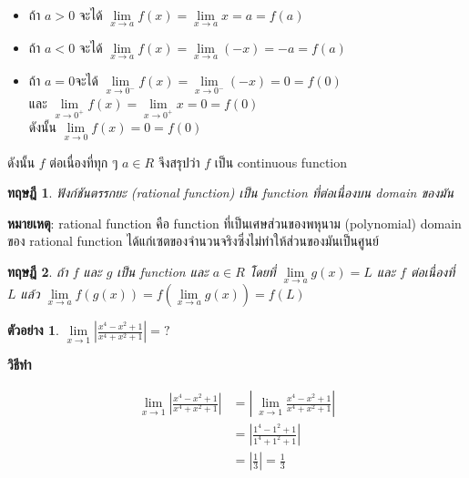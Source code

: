 \documentclass[
]{book}
\newtheorem{theorem}{ทฤษฎี}[chapter]
\theoremstyle{definition}
\theoremstyle{definition}
\newtheorem{example}{ตัวอย่าง}[chapter]
\theoremstyle{definition}
\theoremstyle{definition}
\theoremstyle{remark}
\begin{document}
\begin{itemize}
\item
  ถ้า \(a>0\) จะได้
  \(\underset{x\rightarrow a}{\lim}f(x)=\underset{x\rightarrow a}{\lim}x=a=f(a)\)
\item
  ถ้า \(a<0\) จะได้
  \(\underset{x\rightarrow a}{\lim}f(x)=\underset{x\rightarrow a}{\lim}(-x)=-a=f(a)\)
\item
  ถ้า \(a=0\)จะได้
  \(\underset{x\rightarrow 0^{-}}{\lim}f(x)=\underset{x\rightarrow 0^{-}}{\lim}(-x)=0=f(0)\)\\
  และ
  \(\underset{x\rightarrow 0^{+}}{\lim}f(x)=\underset{x\rightarrow 0^{+}}{\lim}x=0=f(0)\)\\
  ดังนั้น \(\underset{x\rightarrow 0}{\lim}f(x)=0=f(0)\)
\end{itemize}

ดังนั้น \(f\) ต่อเนื่องที่ทุก ๆ \(a\in R\) จึงสรุปว่า \(f\) เป็น continuous function

\begin{theorem}
\protect\hypertarget{thm:thm-cont-2}{}\label{thm:thm-cont-2}ฟังก์ชันตรรกยะ (rational function) เป็น function ที่ต่อเนื่องบน domain ของมัน
\end{theorem}

\textbf{หมายเหตุ}: rational function คือ function ที่เป็นเศษส่วนของพหุนาม
(polynomial) domain ของ rational function
ได้แก่เซตของจำนวนจริงซึ่งไม่ทำให้ส่วนของมันเป็นศูนย์

\begin{theorem}
\protect\hypertarget{thm:thm-cont-3}{}\label{thm:thm-cont-3}ถ้า \(f\) และ \(g\) เป็น function และ \(a\in R\) โดยที่
\(\underset{x\rightarrow a}{\lim}g(x)=L\) และ \(f\) ต่อเนื่องที่ \(L\) แล้ว
\(\underset{x\rightarrow a}{\lim}f(g(x))=f(\underset{x\rightarrow a}{\lim}g(x))=f(L)\)
\end{theorem}

\begin{example}
\protect\hypertarget{exm:ex-cont-2}{}\label{exm:ex-cont-2}\(\underset{x\rightarrow 1}{\lim}\left| \frac{x^{4}-x^{2}+1}{x^{4}+x^{2}+1}\right| =?\)
\end{example}

\textbf{วิธีทำ}

\begin{equation}
  \begin{aligned}
    \underset{x\rightarrow 1}{\lim}\left| \frac{x^{4}-x^{2}+1}{x^{4}+x^{2}+1}\right|
    &=\left| \ \underset{x\rightarrow 1}{\lim}\frac{x^{4}-x^{2}+1}{x^{4}+x^{2}+1}\right| \\
    &=\left| \frac{1^{4}-1^{2}+1}{1^{4}+1^{2}+1}\right| \\
    &=\left| \frac{1}{3}\right| =\frac{1}{3}
  \end{aligned}
\end{equation}
\end{document}
